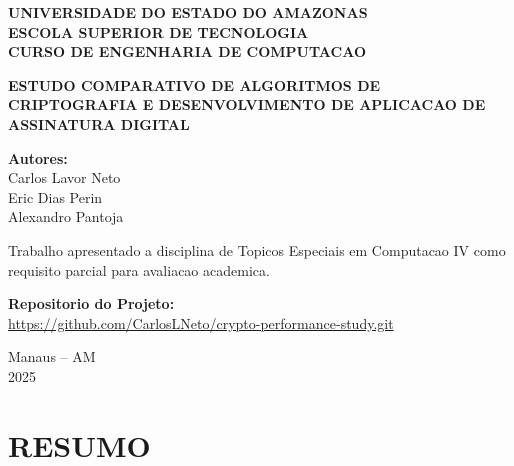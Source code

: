 \documentclass[12pt,a4paper,oneside]{article}
\begin{document}
\begin{titlepage}
\centering
\vspace*{1cm}

{\fontsize{14}{16}\selectfont\bfseries\uppercase{Universidade do Estado do Amazonas}}\\
{\fontsize{14}{16}\selectfont\bfseries\uppercase{Escola Superior de Tecnologia}}\\
{\fontsize{14}{16}\selectfont\bfseries\uppercase{Curso de Engenharia de Computacao}}\\

\vspace{3cm}

{\fontsize{14}{16}\selectfont\bfseries\uppercase{Estudo Comparativo de Algoritmos de Criptografia e Desenvolvimento de Aplicacao de Assinatura Digital}}

\vspace{3cm}

{\fontsize{12}{14}\selectfont
\textbf{Autores:}\\
Carlos Lavor Neto\\
Eric Dias Perin\\
Alexandro Pantoja\\
}

\vspace{2cm}

{\fontsize{12}{14}\selectfont
Trabalho apresentado a disciplina de Topicos Especiais em Computacao IV como requisito parcial para avaliacao academica.

\vspace{0.5cm}
\textbf{Repositorio do Projeto:}\\
\url{https://github.com/CarlosLNeto/crypto-performance-study.git}
}

\vfill

{\fontsize{12}{14}\selectfont
Manaus -- AM\\
2025
}

\end{titlepage}

\newpage
\section*{RESUMO}
\end{document}
